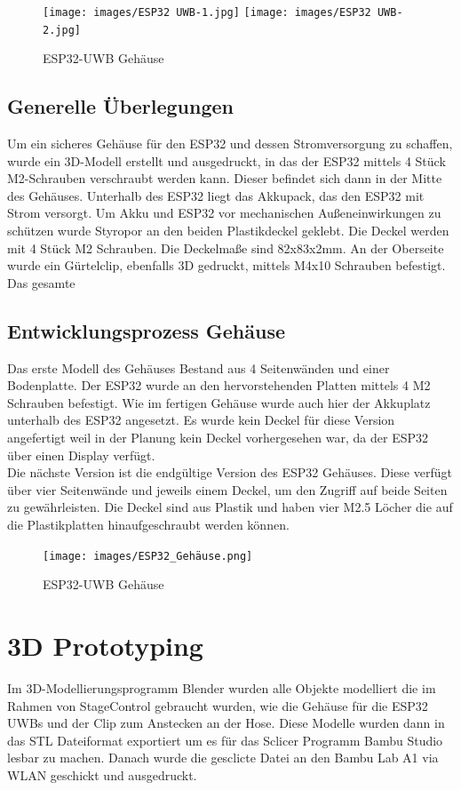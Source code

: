 \begin{figure}[H]
	\centering
	\texttt{[image: images/ESP32 UWB-1.jpg]}
	\texttt{[image: images/ESP32 UWB-2.jpg]}
	\caption[ESP32-UWB Gehäuse]{ESP32-UWB Gehäuse}
	\label{fig:ESP32-UWB Gehäuse V2}
\end{figure}

\subsection{Generelle Überlegungen}
Um ein sicheres Gehäuse für den ESP32 und dessen Stromversorgung zu schaffen, wurde ein 3D-Modell erstellt und ausgedruckt, in das der ESP32 mittels 4 Stück M2-Schrauben verschraubt werden kann. Dieser befindet sich dann in der Mitte des Gehäuses. Unterhalb des ESP32 liegt das Akkupack, das den ESP32 mit Strom versorgt.
Um Akku und ESP32 vor  mechanischen Außeneinwirkungen zu schützen wurde Styropor an den beiden Plastikdeckel geklebt. Die Deckel werden mit 4 Stück M2 Schrauben. 
Die Deckelmaße sind 82x83x2mm. An der Oberseite wurde ein Gürtelclip, ebenfalls 3D gedruckt, mittels M4x10 Schrauben befestigt. Das gesamte 

\subsection{Entwicklungsprozess Gehäuse}
Das erste Modell des Gehäuses Bestand aus 4 Seitenwänden und einer Bodenplatte. Der ESP32 wurde an den hervorstehenden Platten mittels 4 M2 Schrauben befestigt. Wie im fertigen Gehäuse wurde auch hier der Akkuplatz unterhalb des ESP32 angesetzt. Es wurde kein Deckel für diese Version angefertigt weil in der Planung kein Deckel vorhergesehen war, da der ESP32 über einen Display verfügt. \\
Die nächste Version ist die endgültige Version des ESP32 Gehäuses. Diese verfügt über vier Seitenwände und jeweils einem Deckel, um den Zugriff auf beide Seiten zu gewährleisten. Die Deckel sind aus Plastik und haben vier M2.5 Löcher die auf die Plastikplatten hinaufgeschraubt werden können.

\begin{figure}[H]
	\centering
	\texttt{[image: images/ESP32\_Gehäuse.png]}
	\caption[ESP32-UWB Gehäuse]{ESP32-UWB Gehäuse}
	\label{fig:ESP32-UWB Gehäuse}
\end{figure}


\section{3D Prototyping}
Im 3D-Modellierungsprogramm Blender wurden alle Objekte modelliert die im Rahmen von StageControl gebraucht wurden, wie die Gehäuse für die ESP32 UWBs und der Clip zum Anstecken an der Hose. Diese Modelle wurden dann in das STL Dateiformat exportiert um es für das Sclicer Programm Bambu Studio lesbar zu machen. Danach wurde die gesclicte Datei an den Bambu Lab A1 via WLAN geschickt und ausgedruckt.


